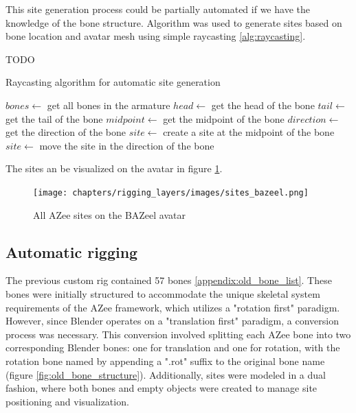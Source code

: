 \documentclass[../../main.tex]{subfiles}
\begin{document}
This site generation process could be partially automated if we have the knowledge of the bone structure. Algorithm was used to generate sites based on bone location and avatar mesh using simple raycasting \ref{alg:raycasting}.

TODO
\begin{algorithm}
    \label{alg:raycasting}
    \caption{Raycasting algorithm for automatic site generation}
    \begin{algorithmic}
        \State $bones \gets$ get all bones in the armature
            \State $head \gets$ get the head of the bone
            \State $tail \gets$ get the tail of the bone
            \State $midpoint \gets$ get the midpoint of the bone
            \State $direction \gets$ get the direction of the bone
            \State $site \gets$ create a site at the midpoint of the bone
            \State $site \gets$ move the site in the direction of the bone
        \EndFor
    \end{algorithmic}
\end{algorithm}

The sites an be visualized on the avatar in figure \ref{fig:sites_bazeel}.

\begin{figure}[h]
    \centering
    \texttt{[image: chapters/rigging\_layers/images/sites\_bazeel.png]}
    \caption{All AZee sites on the BAZeel avatar}
    \label{fig:sites_bazeel}
\end{figure}

\subsection{Automatic rigging}

The previous custom rig contained 57 bones \ref{appendix:old_bone_list}. These bones were initially structured to accommodate the unique skeletal system requirements of the AZee framework, which utilizes a "rotation first" paradigm. However, since Blender operates on a "translation first" paradigm, a conversion process was necessary. This conversion involved splitting each AZee bone into two corresponding Blender bones: one for translation and one for rotation, with the rotation bone named by appending a ".rot" suffix to the original bone name (figure \ref{fig:old_bone_structure}). Additionally, sites were modeled in a dual fashion, where both bones and empty objects were created to manage site positioning and visualization.
\end{document}
